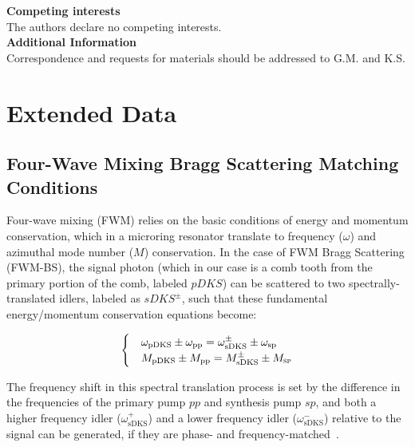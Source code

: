 \documentclass[reprint,superscriptaddress, amsmath,amssymb,pra, aps,floatfix,longbibliography]{revtex4-1}
\newcommand{\beginsupplement}{%
 \setcounter{table}{0}
 \renewcommand{\thetable}{S\arabic{table}}%
 \setcounter{figure}{0}
 \renewcommand{\thefigure}{S\arabic{figure}}%
 \renewcommand{\thesubsection}{S-\arabic{subsection}}
}
\begin{document}
\noindent \textbf{\large Competing interests}\\
The authors declare no competing interests.\\

\noindent \textbf{\large Additional Information}\\
Correspondence and requests for materials should be addressed to G.M. and K.S.




\clearpage


\clearpage
\section*{Extended Data}
\beginsupplement

\subsection{Four-Wave Mixing Bragg Scattering Matching Conditions}
\label{sub:sup-mat-FWMBS}
Four-wave mixing (FWM) relies on the basic conditions of energy and momentum conservation, which in a microring resonator translate to frequency ($\omega$) and azimuthal mode number ($M$) conservation. In the case of FWM Bragg Scattering (FWM-BS), the signal photon (which in our case is a comb tooth from the primary portion of the comb, labeled $pDKS$) can be scattered to two spectrally-translated idlers, labeled as $sDKS^{\pm}$, such that these fundamental energy/momentum conservation equations become:


\begin{equation}
\label{sup_eq:FWM}
\begin{cases}
 & \omega_\mathrm{pDKS} \pm \omega_\mathrm{pp} =  \omega_\mathrm{sDKS}^{\pm} \pm \omega_\mathrm{sp}\\
 & M_\mathrm{pDKS} \pm M_\mathrm{pp} = M_\mathrm{sDKS}^{\pm} \pm M_\textsc{sp}
\end{cases}
\end{equation}

The frequency shift in this spectral translation process is set by the difference in the frequencies of the primary pump $pp$ and synthesis pump $sp$, and both a higher frequency idler ($\omega_\mathrm{sDKS}^{+}$) and a lower frequency idler ($\omega_\mathrm{sDKS}^{-}$) relative to the signal can be generated, if they are phase- and frequency-matched~\cite{li_efficient_2016}.
\end{document}
